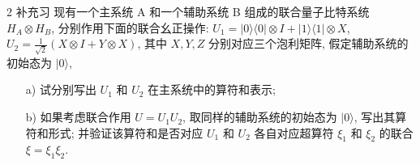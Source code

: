 \documentclass{assignment}
\begin{document}
\begin{probcontinued}{2 补充习}
    现有一个主系统 A 和一个辅助系统 B 组成的联合量子比特系统 $H_A\otimes H_B$, 分别作用下面的联合幺正操作: $U_1=\lvert 0\rangle\langle 0\rvert\otimes I+\lvert 1\rangle\langle 1\rvert\otimes X$, $U_2=\frac{1}{\sqrt{2}}(X\otimes I+Y\otimes X)$, 其中 $X,Y,Z$ 分别对应三个泡利矩阵, 假定辅助系统的初始态为 $\lvert 0\rangle$,
    \begin{itemize}
        \item[a)] 试分别写出 $U_1$ 和 $U_2$ 在主系统中的算符和表示;
        \item[b)] 如果考虑联合作用 $U=U_1U_2$, 取同样的辅助系统的初始态为 $\lvert 0\rangle$, 写出其算符和形式; 并验证该算符和是否对应 $U_1$ 和 $U_2$ 各自对应超算符 $\xi_1$ 和 $\xi_2$ 的联合 $\xi=\xi_1\xi_2$.
    \end{itemize}
\end{probcontinued}
\end{document}
